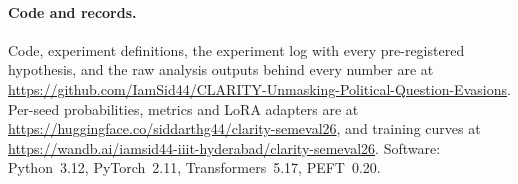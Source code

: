 \paragraph{Code and records.}
Code, experiment definitions, the experiment log with every pre-registered hypothesis, and the raw analysis outputs behind every number are at \url{https://github.com/IamSid44/CLARITY-Unmasking-Political-Question-Evasions}.
Per-seed probabilities, metrics and LoRA adapters are at \url{https://huggingface.co/siddarthg44/clarity-semeval26}, and training curves at \url{https://wandb.ai/iamsid44-iiit-hyderabad/clarity-semeval26}.
Software: Python~3.12, PyTorch~2.11, Transformers~5.17, PEFT~0.20.

